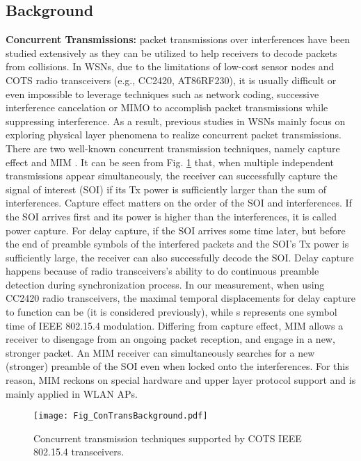 \documentclass[conference]{IEEEtran}
\begin{document}
\subsection{Background}
\textbf{Concurrent Transmissions:} packet transmissions over interferences have been studied extensively as they can be utilized to help receivers to decode packets from collisions.
In WSNs, due to the limitations of low-cost sensor nodes and COTS radio transceivers (e.g., CC2420, AT86RF230), it is usually difficult or even impossible to leverage techniques such as network coding, successive interference cancelation or MIMO to accomplish packet transmissions while suppressing interference.
As a result, previous studies in WSNs mainly focus on exploring physical layer phenomena to realize concurrent packet transmissions.\\
\indent There are two well-known concurrent transmission techniques, namely capture effect \cite{leentvaar1976captureeffect} and MIM \cite{santhapuri2008message}.
It can be seen from Fig. \ref{Fig_ConCurrentOverview} that, when multiple independent transmissions appear simultaneously, the receiver can successfully capture the signal of interest (SOI) if its Tx power is sufficiently larger than the sum of interferences.
Capture effect matters on the order of the SOI and interferences.
If the SOI arrives first and its power is higher than the interferences, it is called power capture.
For delay capture, if the SOI arrives some time later, but before the end of preamble symbols of the interfered packets and the SOI's Tx power is sufficiently large, the receiver can also successfully decode the SOI.
Delay capture happens because of radio transceivers's ability to do continuous preamble detection during synchronization process.
In our measurement, when using CC2420 radio transceivers, the maximal temporal displacements for delay capture to function can be  (it is considered  previously), while s represents one symbol time of IEEE 802.15.4 modulation.
Differing from capture effect, MIM allows a receiver to disengage from an ongoing packet reception, and engage in a new, stronger packet.
An MIM receiver can simultaneously searches for a new (stronger) preamble of the SOI even when locked onto the interferences.
For this reason, MIM reckons on special hardware and upper layer protocol support and is mainly applied in WLAN APs.\\
\begin{figure}
\centering
\texttt{[image: Fig\_ConTransBackground.pdf]}
\caption{Concurrent transmission techniques supported by COTS IEEE 802.15.4 transceivers.}
\label{Fig_ConCurrentOverview}
\end{figure}
\end{document}
